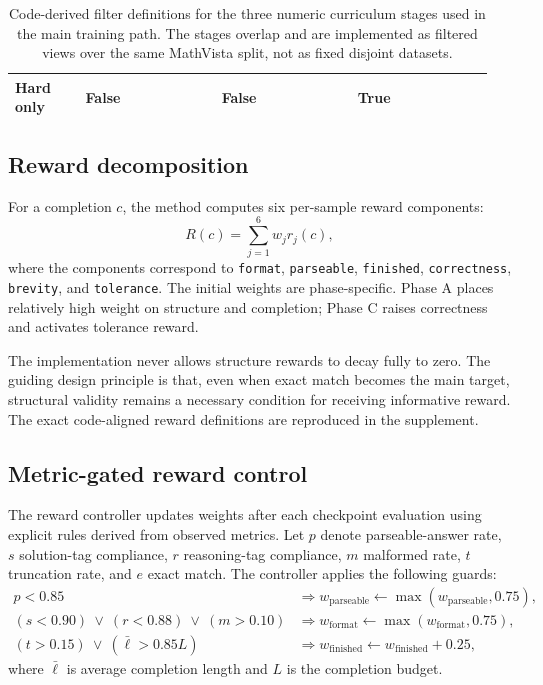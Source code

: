 \documentclass{article} %
\begin{document}
\begin{table}[t]
\begin{tabular}{>{\raggedright\arraybackslash}p{0.14\linewidth}>{\raggedright\arraybackslash}p{0.27\linewidth}>{\raggedright\arraybackslash}p{0.27\linewidth}>{\raggedright\arraybackslash}p{0.27\linewidth}}
\hline
Hard only & False & False & True \\
\hline
\end{tabular}
\caption{Code-derived filter definitions for the three numeric curriculum stages used in the main training path. The stages overlap and are implemented as filtered views over the same MathVista split, not as fixed disjoint datasets.}
\label{tab:stage-matrix}
\end{table}

\subsection{Reward decomposition}

For a completion $c$, the method computes six per-sample reward components:
\begin{equation}
R(c)=\sum_{j=1}^{6} w_j r_j(c),
\end{equation}
where the components correspond to \texttt{format}, \texttt{parseable}, \texttt{finished}, \texttt{correctness}, \texttt{brevity}, and \texttt{tolerance}. The initial weights are phase-specific. Phase A places relatively high weight on structure and completion; Phase C raises correctness and activates tolerance reward.

The implementation never allows structure rewards to decay fully to zero. The guiding design principle is that, even when exact match becomes the main target, structural validity remains a necessary condition for receiving informative reward. The exact code-aligned reward definitions are reproduced in the supplement.

\subsection{Metric-gated reward control}

The reward controller updates weights after each checkpoint evaluation using explicit rules derived from observed metrics. Let $p$ denote parseable-answer rate, $s$ solution-tag compliance, $r$ reasoning-tag compliance, $m$ malformed rate, $t$ truncation rate, and $e$ exact match. The controller applies the following guards:
\begin{align}
p < 0.85 &\Rightarrow w_{\text{parseable}} \leftarrow \max(w_{\text{parseable}}, 0.75),\\
(s < 0.90)\ \vee\ (r < 0.88)\ \vee\ (m > 0.10) &\Rightarrow w_{\text{format}} \leftarrow \max(w_{\text{format}}, 0.75),\\
(t > 0.15)\ \vee\ (\bar{\ell} > 0.85L) &\Rightarrow w_{\text{finished}} \leftarrow w_{\text{finished}} + 0.25,
\end{align}
where $\bar{\ell}$ is average completion length and $L$ is the completion budget.
\end{document}
